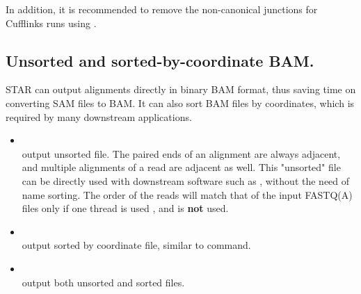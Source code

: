 \documentclass[12pt]{article}
\begin{document}
In addition, it is recommended to remove the non-canonical junctions for Cufflinks runs using  .

\subsection{Unsorted and sorted-by-coordinate BAM.}
STAR can output alignments directly in binary BAM format, thus saving time on converting SAM files to BAM. It can also sort BAM files by coordinates, which is required by many downstream applications.
\begin{itemize}
\raggedright
\item[]
 \\
output unsorted  file. The paired ends of an alignment are always adjacent, and multiple alignments of a read are adjacent as well. This "unsorted" file can be directly used with downstream software such as , without the need of name sorting. The order of the reads will match that of the input FASTQ(A) files only if one thread is used  , and   is \textbf{not} used.
\item[]
 \\
output sorted by coordinate  file, similar to  command.
\item[]
 \\
output both unsorted and sorted files.
\end{itemize}
\end{document}
